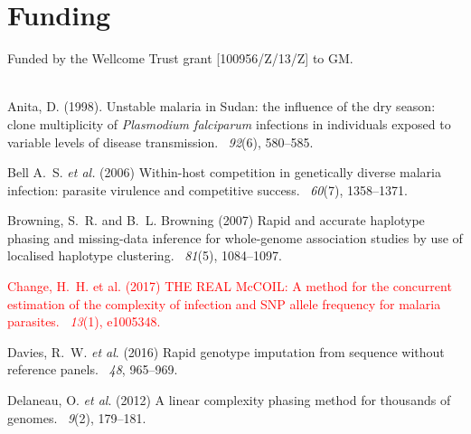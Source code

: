 \documentclass{bioinfo}
\newcounter{todocounter}
\newcommand{\done}[2][]
{\todo[color=green!40, #1]{#2}}
\newcommand{\donenum}[2][]
{\stepcounter{todocounter}\done[#1]{\thetodocounter: #2}}
\begin{document}
\section*{Funding}
Funded by the Wellcome Trust grant [100956/Z/13/Z] to GM.\\
~\\


\begin{thebibliography}{}

Anita, D. (1998).
\newblock Unstable malaria in Sudan: the influence of the dry season: clone
  multiplicity of {\it Plasmodium falciparum} infections in individuals exposed to
  variable levels of disease transmission.
~{\em 92\/}(6), 580--585.

Bell A.~S. {\em et al.} (2006)
\newblock Within-host competition in genetically diverse malaria infection: parasite virulence and competitive success.
~{\em 60}(7), 1358--1371.

Browning, S.~R. and B.~L. Browning (2007)
\newblock Rapid and accurate haplotype phasing and missing-data inference for
  whole-genome association studies by use of localised haplotype clustering.
~{\em 81\/}(5), 1084--1097.

\textcolor{red}{Change, H.~H. et al. (2017)
\newblock THE REAL McCOIL: A method for the concurrent estimation of the complexity of infection and SNP allele frequency for malaria parasites.
~{\em 13\/}(1), e1005348.}
\donenum{Change, H.~H. et al. (2017)}

Davies, R.~W. {\em et al}. (2016)
Rapid genotype imputation from sequence without reference panels.
~{\em 48\/}, 965--969.

Delaneau, O. {\em et al}. (2012)
\newblock A linear complexity phasing method for thousands of genomes.
~{\em 9\/}(2), 179--181.


\end{thebibliography}
\end{document}
